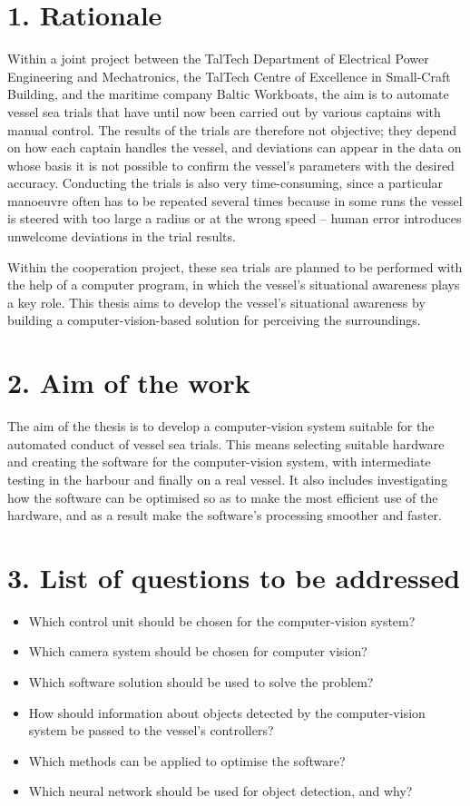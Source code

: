 \section*{1. Rationale}

Within a joint project between the TalTech Department of Electrical Power Engineering and Mechatronics, the TalTech Centre of Excellence in Small-Craft Building, and the maritime company Baltic Workboats, the aim is to automate vessel sea trials that have until now been carried out by various captains with manual control. The results of the trials are therefore not objective; they depend on how each captain handles the vessel, and deviations can appear in the data on whose basis it is not possible to confirm the vessel's parameters with the desired accuracy. Conducting the trials is also very time-consuming, since a particular manoeuvre often has to be repeated several times because in some runs the vessel is steered with too large a radius or at the wrong speed -- human error introduces unwelcome deviations in the trial results.

Within the cooperation project, these sea trials are planned to be performed with the help of a computer program, in which the vessel's situational awareness plays a key role. This thesis aims to develop the vessel's situational awareness by building a computer-vision-based solution for perceiving the surroundings.

\section*{2. Aim of the work}

The aim of the thesis is to develop a computer-vision system suitable for the automated conduct of vessel sea trials. This means selecting suitable hardware and creating the software for the computer-vision system, with intermediate testing in the harbour and finally on a real vessel. It also includes investigating how the software can be optimised so as to make the most efficient use of the hardware, and as a result make the software's processing smoother and faster.

\section*{3. List of questions to be addressed}

\begin{itemize}
  \item Which control unit should be chosen for the computer-vision system?
  \item Which camera system should be chosen for computer vision?
  \item Which software solution should be used to solve the problem?
  \item How should information about objects detected by the computer-vision system be passed to the vessel's controllers?
  \item Which methods can be applied to optimise the software?
  \item Which neural network should be used for object detection, and why?
\end{itemize}

